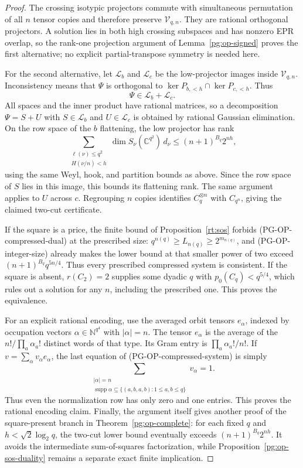 \begin{proof}
The crossing isotypic projectors commute with simultaneous permutation
of all $n$ tensor copies and therefore preserve $\mathcal V_{q,n}$.
They are rational orthogonal projectors. A solution lies in both high
crossing subspaces and has nonzero EPR overlap, so the rank-one
projection argument of Lemma~\ref{pg:op-signed} proves the first
alternative; no explicit partial-transpose symmetry is needed here.

For the second alternative, let $\mathcal L_b$ and $\mathcal L_c$ be
the low-projector images inside $\mathcal V_{q,n}$. Inconsistency means
that $\Psi$ is orthogonal to
$\ker P_{b,<h}\cap\ker P_{c,<h}$. Thus
\[
 \Psi\in\mathcal L_b+\mathcal L_c.
\]
All spaces and the inner product have rational matrices, so a
decomposition $\Psi=S+U$ with $S\in\mathcal L_b$ and
$U\in\mathcal L_c$ is obtained by rational Gaussian elimination.
On the row space of the $b$ flattening, the low projector has rank
\[
 \sum_{\substack{\ell(\nu)\leq q^2\\H(\nu/n)<h}}
     \dim S_\nu(\mathbb C^{q^2})\,d_\nu
 \leq(n+1)^{B_q}2^{nh},
\]
using the same Weyl, hook, and partition bounds as above. Since the row
space of $S$ lies in this image, this bounds its flattening rank. The
same argument applies to $U$ across $c$. Regrouping $n$ copies identifies
$C_q^{\otimes n}$ with $C_{q^n}$, giving the claimed two-cut
certificate.

If the square is a price, the finite bound of
Proposition~\ref{rt:sos} forbids (PG-OP-compressed-dual) at the prescribed
size: $q^{n(q)}\geq L_{n(q)}\geq2^{m_{n(q)}}$, and
(PG-OP-integer-size) already makes the lower bound at that smaller power
of two exceed $(n+1)^{B_q}q^{5n/4}$. Thus every prescribed compressed
system is consistent. If the square is absent, $r(C_2)=2$ supplies some
dyadic $q$ with $p_0(C_q)<q^{5/4}$, which rules out a solution for any
$n$, including the prescribed one. This proves the equivalence.

For an explicit rational encoding, use the averaged orbit tensors
$e_\alpha$, indexed by occupation vectors
$\alpha\in\mathbb N^{q^4}$ with $|\alpha|=n$. The tensor $e_\alpha$ is
the average of the $n!/\prod_a\alpha_a!$ distinct words of that type.
Its Gram entry is $\prod_a\alpha_a!/n!$. If $v=\sum_\alpha v_\alpha
e_\alpha$, the last equation of (PG-OP-compressed-system) is simply
\[
 \sum_{\substack{|\alpha|=n\\
 \operatorname{supp}\alpha\subseteq
 \{(a,b,a,b):1\leq a,b\leq q\}}}v_\alpha=1.
\]
Thus even the normalization row has only zero and one entries. This
proves the rational encoding claim. Finally, the argument itself gives
another proof of the square-present branch in
Theorem~\ref{pg:op-complete}: for each fixed $q$ and
$h<\sqrt2\log_2q$, the two-cut lower bound eventually exceeds
$(n+1)^{B_q}2^{nh}$. It avoids the intermediate sum-of-squares
factorization, while Proposition~\ref{pg:op-sos-duality} remains a
separate exact finite implication.
\end{proof}

